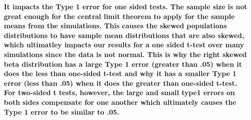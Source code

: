 \documentclass{article}\usepackage[]{graphicx}\usepackage[]{xcolor}
\begin{document}
\begin{enumerate}
\begin{enumerate}
    \textbf{It impacts the Type 1 error for one sided tests. The sample size is not great enough for the central limit theorem to apply for the sample means from the simulations. This causes the skewed populations distributions to have sample mean distributions that are also skewed, which ultimatley impacts our results for a one sided t-test over many simulations since the data is not normal. This is why the right skewed beta distribution has a large Type 1 error (greater than .05) when it does the less than one-sided t-test and why it has a smaller Type 1 error (less than .05) when it does the greater than one-sided t-test. For two-sided t tests, however, the large and small type1 errors on both sides compensate for one another which ultimately causes the Type 1 error to be similar to .05. }
  \end{enumerate}
\end{enumerate}

\end{document}

